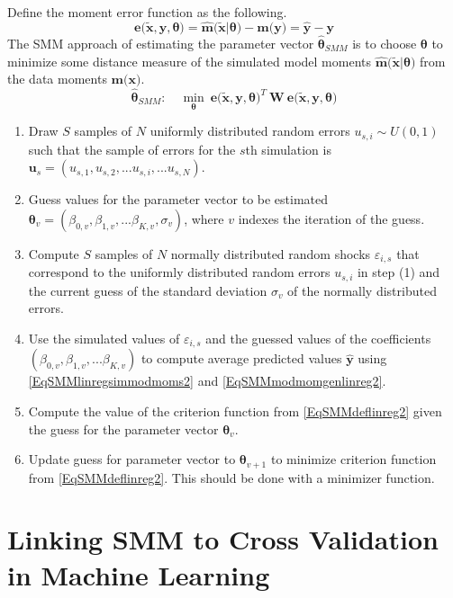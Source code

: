 \documentclass[letterpaper,12pt]{article}
\theoremstyle{definition}
\newcommand\ve{\varepsilon}
\begin{document}
    Define the moment error function as the following.
    \begin{equation}
      \bm{e}\bigl(\bm{\tilde{x}},\bm{y},\bm{\theta}\bigr) = \bm{\hat{m}}\bigl(\bm{\tilde{x}}|\bm{\theta}\bigr) - \bm{m}\bigl(\bm{y}\bigr) = \bm{\hat{y}} - \bm{y}
    \end{equation}
    The SMM approach of estimating the parameter vector $\bm{\hat{\theta}}_{SMM}$ is to choose $\bm{\theta}$ to minimize some distance measure of the simulated model moments $\bm{\hat{m}}\bigl(\bm{\tilde{x}}|\bm{\theta}\bigr)$ from the data moments $\bm{m}\bigl(\bm{x}\bigr)$.
    \begin{equation}\label{EqSMMdeflinreg2}
      \bm{\hat{\theta}}_{SMM}:\quad \min_{\bm{\theta}}\:\bm{e}\bigl(\bm{\tilde{x}},\bm{y},\bm{\theta}\bigr)^T \: \bm{W} \: \bm{e}\bigl(\bm{\tilde{x}},\bm{y},\bm{\theta}\bigr)
    \end{equation}

    \begin{enumerate}
      \item Draw $S$ samples of $N$ uniformly distributed random errors $u_{s,i}\sim U(0,1)$ such that the sample of errors for the $s$th simulation is $\bm{u}_s=(u_{s,1}, u_{s,2},...u_{s,i},...u_{s,N})$.
      \item Guess values for the parameter vector to be estimated $\bm{\theta}_v = (\beta_{0,v},\beta_{1,v},...\beta_{K,v}, \sigma_v)$, where $v$ indexes the iteration of the guess.
      \item Compute $S$ samples of $N$ normally distributed random shocks $\ve_{i,s}$ that correspond to the uniformly distributed random errors $u_{s,i}$ in step (1) and the current guess of the standard deviation $\sigma_v$ of the normally distributed errors.
      \item Use the simulated values of $\ve_{i,s}$ and the guessed values of the coefficients $(\beta_{0,v},\beta_{1,v},...\beta_{K,v})$ to compute average predicted values $\bm{\hat{y}}$ using \eqref{EqSMMlinregsimmodmoms2} and \eqref{EqSMMmodmomgenlinreg2}.
      \item Compute the value of the criterion function from \eqref{EqSMMdeflinreg2} given the guess for the parameter vector $\bm{\theta}_v$.
      \item Update guess for parameter vector to $\bm{\theta}_{v+1}$ to minimize criterion function from \eqref{EqSMMdeflinreg2}. This should be done with a minimizer function.
    \end{enumerate}


\section{Linking SMM to Cross Validation in Machine Learning}



\end{document}
